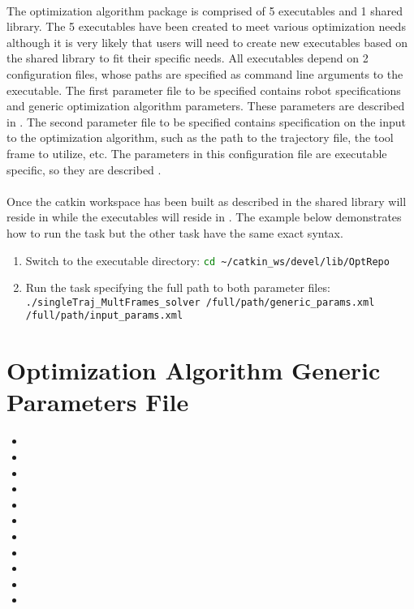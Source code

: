 \documentclass[letterpaper]{article}
\begin{document}
\paragraph{}The optimization algorithm package is comprised of 5 executables and 1 shared library. The 5 executables have been created to meet various optimization needs although it is very likely that users will need to create new executables based on the shared library to fit their specific needs. All executables depend on 2 configuration files, whose paths are specified as command line arguments to the executable. The first parameter file to be specified contains robot specifications and generic optimization algorithm parameters. These parameters are described in . The second parameter file to be specified contains specification on the input to the optimization algorithm, such as the path to the trajectory file, the tool frame to utilize, etc. The parameters in this configuration file are executable specific, so they are described .

\paragraph{}Once the catkin workspace has been built as described in  the shared library will reside in  while the executables will reside in . The example below demonstrates how to run the  task but the other task have the same exact syntax.

\begin{enumerate}
	\item Switch to the executable directory: \lstinline[language=bash]!cd ~/catkin_ws/devel/lib/OptRepo!
	\item Run the task specifying the full path to both parameter files: \newline \lstinline[language=bash]!./singleTraj_MultFrames_solver /full/path/generic_params.xml /full/path/input_params.xml!
\end{enumerate}

\section{Optimization Algorithm Generic Parameters File} \label{sec:genericConfigFile}
\begin{itemize}
	\item \URDFFile
	\item \EndEffectorName
	\item \BaseName
	\item \VelocityLimits
	\item \Tolerance
	\item \RotTolerance
	\item \XTol
	\item \MaxEval
	\item \Algorithm
	\item \WorkspaceLowerCorner
	\item \WorkspaceUpperCorner
\end{itemize}
\end{document}
